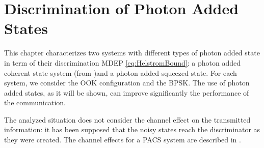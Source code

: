 
\chapter{Discrimination of Photon Added States}
    This chapter characterizes two systems with different types of photon added state in term of
    their discrimination MDEP \ref{eq:HelstromBound}: a photon added coherent state system 
    (from \cite{PACSDisc})and a photon added squeezed state. For each system, we consider the OOK
    configuration and the BPSK.
    The use of photon added states, as it will be shown, can improve significantly the performance
    of the communication. 
    
    The analyzed situation does not consider the channel effect on the transmitted information: it has
    been supposed that the noisy states reach the discriminator as they were created. The channel effects
    for a PACS system are described in \cite{PACSDisc}.

    
    